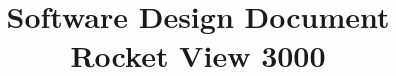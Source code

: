 \documentclass[10pt, letterpaper]{article}
\title{Software Design Document\\
    {\normalsize \bf Rocket View 3000 \vers}
  }
\author{}
\begin{document}
  \maketitle
  {\small }
  \tableofcontents
  \newpage
  
  
  \newpage
  

  \bigskip
  

  \bigskip
  


  \bigskip

  

  \bigskip

  
\end{document}
